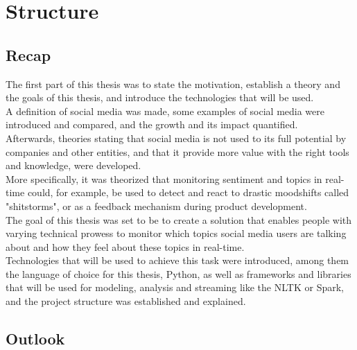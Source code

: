 
\chapter{Structure}
\label{ch:structure}

\section{Recap}
\label{sec:recap}

The first part of this thesis was to state the motivation,
establish a theory and the goals of this thesis, and introduce the technologies that will be used.\\
A definition of social media was made,
some examples of social media were introduced and compared,
and the growth and its impact quantified.\\
Afterwards, theories stating that social media is not used to its full potential by companies and other entities,
and that it provide more value with the right tools and knowledge, were developed. \\
More specifically, it was theorized that monitoring sentiment and topics in real-time could, for example,
be used to detect and react to drastic moodshifts called "shitstorms", or as a feedback mechanism during product development.\\
The goal of this thesis was set to be to create a solution that enables people with varying technical prowess to monitor
which topics social media users are talking about and how they feel about these topics in real-time.\\
Technologies that will be used to achieve this task were introduced, among them the language of choice for this thesis,
Python, as well as frameworks and libraries that will be used for modeling, analysis and streaming like the NLTK or Spark,
and the project structure was established and explained.

\section{Outlook}
\label{sec:outlook}

